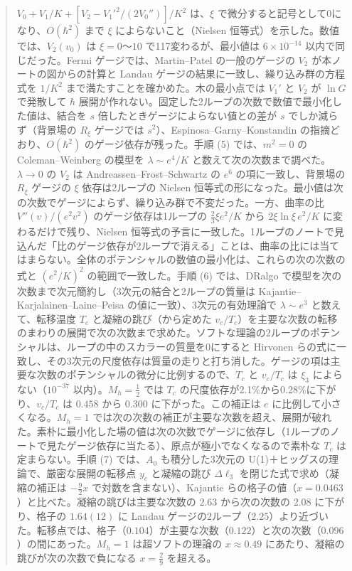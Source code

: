 \documentclass[a4paper,10pt]{ltjsarticle}
\begin{document}
\begin{abstract}
$V_0+V_1/K+[V_2-V_1'^2/(2V_0'')]/K^2$ は、$\xi$ で微分すると記号として0になり、$O(\hbar^2)$ まで $\xi$ によらないこと（Nielsen 恒等式）を示した。数値では、$V_2(v_0)$ は $\xi=0$〜$10$ で117変わるが、最小値は $6\times10^{-14}$ 以内で同じだった。Fermi ゲージでは、Martin--Patel の一般のゲージの $V_2$ が本ノートの図からの計算と Landau ゲージの結果に一致し、繰り込み群の方程式を $1/K^2$ まで満たすことを確かめた。木の最小点では $V_1'$ と $V_2$ が $\ln G$ で発散して $\hbar$ 展開が作れない。固定した2ループの次数で数値で最小化した値は、結合を $s$ 倍したときゲージによらない値との差が $s$ でしか減らず（背景場の $R_\xi$ ゲージでは $s^2$）、Espinosa--Garny--Konstandin の指摘どおり、$O(\hbar^2)$ のゲージ依存が残った。手順 (5) では、$m^2=0$ の Coleman--Weinberg の模型を $\lambda\sim e^4/K$ と数えて次の次数まで調べた。$\lambda\to0$ の $V_2$ は Andreassen--Frost--Schwartz の $e^6$ の項に一致し、背景場の $R_\xi$ ゲージの $\xi$ 依存は2ループの Nielsen 恒等式の形になった。最小値は次の次数でゲージによらず、繰り込み群で不変だった。一方、曲率の比 $V''(v)/(e^2v^2)$ のゲージ依存は1ループの $\frac23\xi e^2/K$ から $2\xi\ln\xi\,e^2/K$ に変わるだけで残り、Nielsen 恒等式の予言に一致した。1ループのノートで見込んだ「比のゲージ依存が2ループで消える」ことは、曲率の比には当てはまらない。全体のポテンシャルの数値の最小化は、これらの次の次数の式と $(e^2/K)^2$ の範囲で一致した。手順 (6) では、DRalgo で模型を次の次数まで次元簡約し（3次元の結合と2ループの質量は Kajantie--Karjalainen--Laine--Peisa の値に一致）、3次元の有効理論で $\lambda\sim e^3$ と数えて、転移温度 $T_c$ と凝縮の跳び（から定めた $v_c/T_c$）を主要な次数の転移のまわりの展開で次の次数まで求めた。ソフトな理論の2ループのポテンシャルは、ループの中のスカラーの質量を0にすると Hirvonen らの式に一致し、その3次元の尺度依存は質量の走りと打ち消した。ゲージの項は主要な次数のポテンシャルの微分に比例するので、$T_c$ と $v_c/T_c$ は $\xi_3$ によらない（$10^{-37}$ 以内）。$M_h=\frac12$ では $T_c$ の尺度依存が2.1\%から0.28\%に下がり、$v_c/T_c$ は $0.458$ から $0.300$ に下がった。この補正は $e$ に比例して小さくなる。$M_h=1$ では次の次数の補正が主要な次数を超え、展開が破れた。素朴に最小化した場の値は次の次数でゲージに依存し（1ループのノートで見たゲージ依存に当たる）、原点が極小でなくなるので素朴な $T_c$ は定まらない。手順 (7) では、$A_0$ も積分した3次元の U(1)＋ヒッグスの理論で、厳密な展開の転移点 $y_c$ と凝縮の跳び $\Delta\ell_3$ を閉じた式で求め（凝縮の補正は $-\frac92x$ で対数を含まない）、Kajantie らの格子の値（$x=0.0463$）と比べた。凝縮の跳びは主要な次数の $2.63$ から次の次数の $2.08$ に下がり、格子の $1.64(12)$ に Landau ゲージの2ループ（$2.25$）より近づいた。転移点では、格子（$0.104$）が主要な次数（$0.122$）と次の次数（$0.096$）の間にあった。$M_h=1$ は超ソフトの理論の $x\approx0.49$ にあたり、凝縮の跳びが次の次数で負になる $x=\frac29$ を超える。
\end{abstract}
\end{document}
